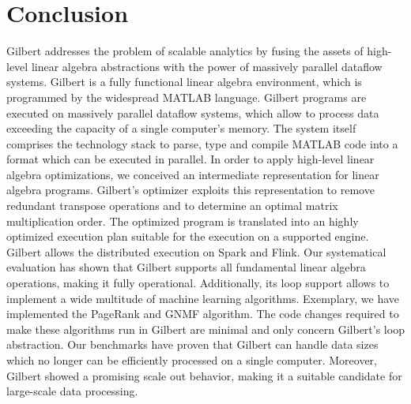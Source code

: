 \section{Conclusion}
\label{sec:conclusion}

Gilbert addresses the problem of scalable analytics by fusing the assets of high-level linear algebra abstractions with the power of massively parallel dataflow systems. Gilbert is a fully functional linear algebra environment, which is programmed by the widespread MATLAB language. Gilbert programs are executed on massively parallel dataflow systems, which allow to process data exceeding the capacity of a single computer's memory. The system itself comprises the technology stack to parse, type and compile MATLAB code into a format which can be executed in parallel. In order to apply high-level linear algebra optimizations, we conceived an intermediate representation for linear algebra programs. Gilbert's optimizer exploits this representation to remove redundant transpose operations and to determine an optimal matrix multiplication order. The optimized program is translated into an highly optimized execution plan suitable for the execution on a supported engine. Gilbert allows the distributed execution on Spark and Flink. Our systematical evaluation has shown that Gilbert supports all fundamental linear algebra operations, making it fully operational.
Additionally, its loop support allows to implement a wide multitude of machine learning algorithms.
Exemplary, we have implemented the PageRank and GNMF algorithm.
The code changes required to make these algorithms run in Gilbert are minimal and only concern Gilbert's loop abstraction.
Our benchmarks have proven that Gilbert can handle data sizes which no longer can be efficiently processed on a single computer.
Moreover, Gilbert showed a promising scale out behavior, making it a suitable candidate for large-scale data processing.

